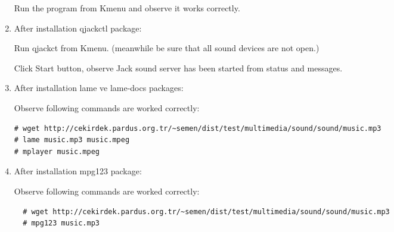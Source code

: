 \documentclass[a4paper,10pt]{article}
\begin{document}
\begin{enumerate}
Run the program from Kmenu and observe it works correctly.

\item After installation qjackctl package: 

Run qjackct from Kmenu. (meanwhile be sure that all sound devices are not open.)

Click Start button, observe Jack sound server has been started from status and messages.

\item After installation lame ve lame-docs packages: 

Observe following commands are worked correctly:
\begin{verbatim}
# wget http://cekirdek.pardus.org.tr/~semen/dist/test/multimedia/sound/sound/music.mp3
# lame music.mp3 music.mpeg
# mplayer music.mpeg
\end{verbatim}

\item After installation mpg123 package:

Observe following commands are worked correctly:
 \begin{verbatim}
  # wget http://cekirdek.pardus.org.tr/~semen/dist/test/multimedia/sound/sound/music.mp3
  # mpg123 music.mp3
 \end{verbatim}


\end{enumerate}
\end{document}
